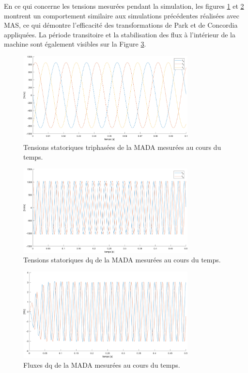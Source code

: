 En ce qui concerne les tensions mesurées pendant la simulation, les figures \ref{img-simuMADA-vs_abc} et \ref{img-simuMADA-vs_dq} montrent un comportement similaire aux simulations précédentes réalisées avec MAS, ce qui démontre l'efficacité des transformations de Park et de Concordia appliquées. La période transitoire et la stabilisation des flux à l'intérieur de la machine sont également visibles sur la Figure \ref{img-simuMADA-fluxes}.


\begin{figure}[!h]
    \centering
    \includegraphics[width=0.8\textwidth]{simusMATLAB/MADA/vs_abc.png} 
    \caption{Tensions statoriques triphasées de la MADA mesurées au cours du temps.}
    \label{img-simuMADA-vs_abc}
\end{figure}


\begin{figure}[!h]
    \centering
    \includegraphics[width=0.8\textwidth]{simusMATLAB/MADA/vs_dq.png} 
    \caption{Tensions statoriques dq de la MADA mesurées au cours du temps.}
    \label{img-simuMADA-vs_dq}
\end{figure}


\begin{figure}[!h]
    \centering
    \includegraphics[width=0.8\textwidth]{simusMATLAB/MADA/fluxes.png} 
    \caption{Fluxes dq de la MADA mesurées au cours du temps.}
    \label{img-simuMADA-fluxes}
\end{figure}


